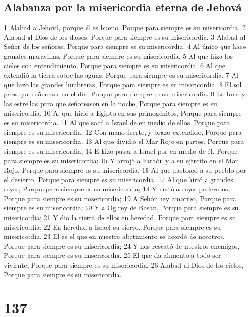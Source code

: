 \section*{Alabanza por la misericordia eterna de Jehová}

1 Alabad a Jehová, porque él es bueno,
Porque para siempre es su misericordia.
2 Alabad al Dios de los dioses,
Porque para siempre es su misericordia.
3 Alabad al Señor de los señores,
Porque para siempre es su misericordia.
4 Al único que hace grandes maravillas,
Porque para siempre es su misericordia.
5 Al que hizo los cielos con entendimiento,
Porque para siempre es su misericordia.
6 Al que extendió la tierra sobre las aguas,
Porque para siempre es su misericordia.
7 Al que hizo las grandes lumbreras,
Porque para siempre es su misericordia.
8 El sol para que señorease en el día,
Porque para siempre es su misericordia.
9 La luna y las estrellas para que señoreasen en la noche,
Porque para siempre es su misericordia.
10 Al que hirió a Egipto en sus primogénitos,
Porque para siempre es su misericordia.
11 Al que sacó a Israel de en medio de ellos,
Porque para siempre es su misericordia.
12 Con mano fuerte, y brazo extendido,
Porque para siempre es su misericordia.
13 Al que dividió el Mar Rojo en partes,
Porque para siempre es su misericordia;
14 E hizo pasar a Israel por en medio de él,
Porque para siempre es su misericordia;
15 Y arrojó a Faraón y a su ejército en el Mar Rojo,
Porque para siempre es su misericordia.
16 Al que pastoreó a su pueblo por el desierto,
Porque para siempre es su misericordia.
17 Al que hirió a grandes reyes,
Porque para siempre es su misericordia;
18 Y mató a reyes poderosos,
Porque para siempre es su misericordia;
19 A Sehón rey amorreo,
Porque para siempre es su misericordia;
20 Y a Og rey de Basán,
Porque para siempre es su misericordia;
21 Y dio la tierra de ellos en heredad,
Porque para siempre es su misericordia;
22 En heredad a Israel su siervo,
Porque para siempre es su misericordia.
23 El es el que en nuestro abatimiento se acordó de nosotros,
Porque para siempre es su misericordia;
24 Y nos rescató de nuestros enemigos,
Porque para siempre es su misericordia.
25 El que da alimento a todo ser viviente,
Porque para siempre es su misericordia.
26 Alabad al Dios de los cielos,
Porque para siempre es su misericordia.

\chapter{137}

